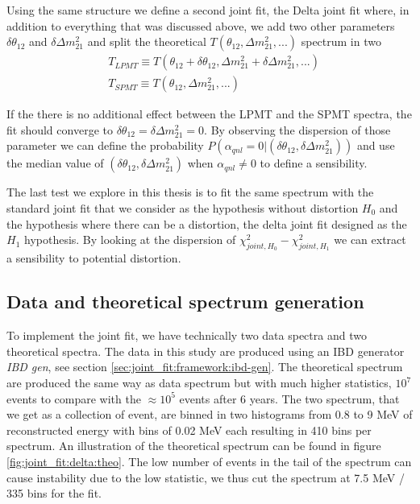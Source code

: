 \documentclass[../main.tex]{subfiles}
\begin{document}
Using the same structure we define a second joint fit, the Delta joint fit where, in addition to everything that was discussed above, we add two other parameters $\delta \theta_{12}$ and $\delta \Delta m^2_{21}$ and split the theoretical $T(\theta_{12}, \Delta m^2_{21}, ...)$ spectrum in two
\begin{equation}
\begin{split}
           &T_{LPMT} \equiv T(\theta_{12} + \delta \theta_{12}, \Delta m^2_{21} + \delta \Delta m^2_{21}, ...) \\
           &T_{SPMT} \equiv T(\theta_{12}                     , \Delta m^2_{21}                         , ...)
\end{split}
\end{equation}

If the there is no additional effect between the LPMT and the SPMT spectra, the fit should converge to $\delta \theta_{12} = \delta \Delta m^2_{21} = 0$. By observing the dispersion of those parameter we can define the probability $P(\alpha_{qnl} = 0 | (\delta \theta_{12}, \delta \Delta m^2_{21}))$ and use the median value of $(\delta \theta_{12}, \delta \Delta m^2_{21})$ when $\alpha_{qnl} \neq 0$ to define a sensibility.

The last test we explore in this thesis is to fit the same spectrum with the standard joint fit that we consider as the hypothesis without distortion $H_0$ and the hypothesis where there can be a distortion, the delta joint fit designed as the $H_1$ hypothesis. By looking at the dispersion of $\chi^2_{joint,H_0} - \chi^2_{joint,H_1}$ we can extract a sensibility to potential distortion.

\subsection{Data and theoretical spectrum generation}

To implement the joint fit, we have technically two data spectra and two theoretical spectra. The data in this study are produced using an IBD generator \textit{IBD gen}, see section \ref{sec:joint_fit:framework:ibd-gen}. The theoretical spectrum are produced the same way as data spectrum but with much higher statistics, $10^7$ events to compare with the $\approx 10^5$ events after 6 years. The two spectrum, that we get as a collection of event, are binned in two histograms from 0.8 to 9 MeV of reconstructed energy with bins of 0.02 MeV each resulting in 410 bins per spectrum. An illustration of the theoretical spectrum can be found in figure \ref{fig:joint_fit:delta:theo}. The low number of events in the tail of the spectrum can cause instability due to the low statistic, we thus cut the spectrum at 7.5 MeV / 335 bins for the fit.
\end{document}
